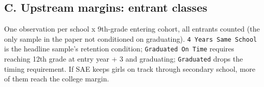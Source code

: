 \documentclass[
]{article}
\begin{document}
\begin{table}[htbp]
   \caption{Admission-Score Percentiles by Gender}\label{tab: gender score percentiles}
   \centerline{}
\end{table}

\hypertarget{c.-upstream-margins-entrant-classes}{%
\subsection{C. Upstream margins: entrant
classes}\label{c.-upstream-margins-entrant-classes}}

One observation per school x 9th-grade entering cohort, all entrants
counted (the only sample in the paper not conditioned on graduating).
\texttt{4\ Years\ Same\ School} is the headline sample's retention
condition; \texttt{Graduated\ On\ Time} requires reaching 12th grade at
entry year + 3 and graduating; \texttt{Graduated} drops the timing
requirement. If SAE keeps girls on track through secondary school, more
of them reach the college margin.
\end{document}
